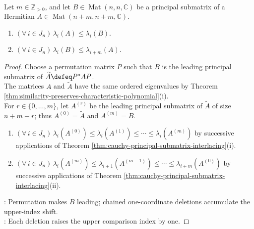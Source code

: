 \begin{corollary} \label{cor:cauchy-interlacing-general-principal-submatrix} \\
Let $m\in\mathbb{Z}_{>0}$, and let $B\in\operatorname{Mat}(n,n,\mathbb{C})$ be a principal submatrix of a Hermitian $A\in\operatorname{Mat}(n+m,n+m,\mathbb{C})$.
\begin{enumerate}[label=(\roman*)]
\setlength{\itemsep}{0pt}
\item $(\forall\,i\in J_n)\,\lambda_i(A)\leq\lambda_i(B)$.
\item $(\forall\,i\in J_n)\,\lambda_i(B)\leq\lambda_{i+m}(A)$.
\end{enumerate}
\begin{proof}
Choose a permutation matrix $P$ such that $B$ is the leading principal submatrix of $\widetilde{A}\defeq P^*AP$.\\
The matrices $A$ and $\widetilde{A}$ have the same ordered eigenvalues by Theorem \ref{thm:similarity-preserves-characteristic-polynomial}(i).\\
For $r\in\{0,\ldots,m\}$, let $A^{(r)}$ be the leading principal submatrix of $\widetilde{A}$ of size $n+m-r$; thus $A^{(0)}=\widetilde{A}$ and $A^{(m)}=B$.
\begin{enumerate}[label=(\roman*)]
\setlength{\itemsep}{0pt}
\item $(\forall\,i\in J_n)\,\lambda_i(A^{(0)})\leq\lambda_i(A^{(1)})\leq\cdots\leq\lambda_i(A^{(m)})$ by successive applications of Theorem \ref{thm:cauchy-principal-submatrix-interlacing}(i).
\item $(\forall\,i\in J_n)\,\lambda_i(A^{(m)})\leq\lambda_{i+1}(A^{(m-1)})\leq\cdots\leq\lambda_{i+m}(A^{(0)})$ by successive applications of Theorem \ref{thm:cauchy-principal-submatrix-interlacing}(ii).
\end{enumerate}
: Permutation makes $B$ leading; chained one-coordinate deletions accumulate the upper-index shift.\\
: Each deletion raises the upper comparison index by one.
\end{proof}
\end{corollary}

